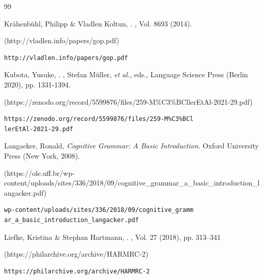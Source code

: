 \begin{thebibliography}{99}
{\begin{bItem}[KrahenbuhlKoltun]
Kr\"ahenb\"uhl, Philipp \& Vladlen Koltun,
.
,
Vol. 8693 (2014).  
%
\begin{boxurl}(http://vladlen.info/papers/gop.pdf)
\begin{lstlisting}
http://vladlen.info/papers/gop.pdf
\end{lstlisting}
\end{boxurl}\end{bItem}



\begin{bItem}[YusukeKubota]
Kubota, Yusuke,
.
,
Stefan M\"uller, \textit{et al.}, eds., 
Language Science Press (Berlin 2020), pp. 1331-1394.
%
\begin{boxurl}(https://zenodo.org/record/5599876/files/259-M\%C3\%BCllerEtAl-2021-29.pdf)
\begin{lstlisting}
https://zenodo.org/record/5599876/files/259-M%C3%BCl
lerEtAl-2021-29.pdf
\end{lstlisting}
\end{boxurl}\end{bItem}



\begin{bItem}[LangackerIntro]
Langacker, Ronald, 
\textit{Cognitive Grammar: A Basic Introduction}.  
Oxford University Press (New York, 2008). 
%
\begin{boxurl}(https://ole.uff.br/wp-content/uploads/sites/336/2018/09/cognitive_grammar_a_basic_introduction_langacker.pdf)
\begin{lstlisting}
wp-content/uploads/sites/336/2018/09/cognitive_gramm
ar_a_basic_introduction_langacker.pdf
\end{lstlisting}
\end{boxurl}\end{bItem}


\begin{bItem}[LiefkeHartmann]
Liefke, Kristina \& Stephan Hartmann, 
.  
,
Vol. 27 (2018),
pp. 313--341
%
\begin{boxurl}(https://philarchive.org/archive/HARMRC-2)
\begin{lstlisting}
https://philarchive.org/archive/HARMRC-2
\end{lstlisting}
\end{boxurl}\end{bItem}




}
\end{thebibliography}

